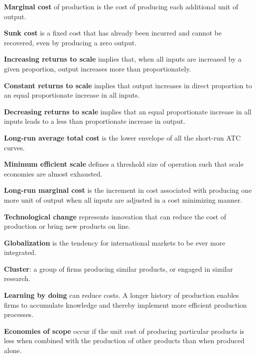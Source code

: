 \begin{keyterms}
\textbf{Marginal cost} of production is the cost of producing each additional unit of output.

\textbf{Sunk cost} is a fixed cost that has already been incurred and cannot be recovered, even by producing a zero output.

\textbf{Increasing returns to scale} implies that, when all inputs are increased by a given proportion, output increases more than proportionately.

\textbf{Constant returns to scale} implies that output increases in direct proportion to an equal proportionate increase in all inputs.

\textbf{Decreasing returns to scale} implies that an equal proportionate increase in all inputs leads to a less than proportionate increase in output.

\textbf{Long-run average total cost} is the lower envelope of all the short-run ATC curves.

\textbf{Minimum efficient scale} defines a threshold size of operation such that scale economies are almost exhausted.

\textbf{Long-run marginal cost} is the increment in cost associated with producing one more unit of output when all inputs are adjusted in a cost minimizing manner.

\textbf{Technological change} represents innovation that can reduce the cost of production or bring new products on line.

\textbf{Globalization} is the tendency for international markets to be ever more integrated.

\textbf{Cluster}: a group of firms producing similar products, or engaged in similar research.

\textbf{Learning by doing} can reduce costs. A longer history of production enables firms to accumulate knowledge and thereby implement more efficient production processes.

\textbf{Economies of scope} occur if the unit cost of producing particular products is less when combined with the production of other products than when produced alone.
\end{keyterms}
